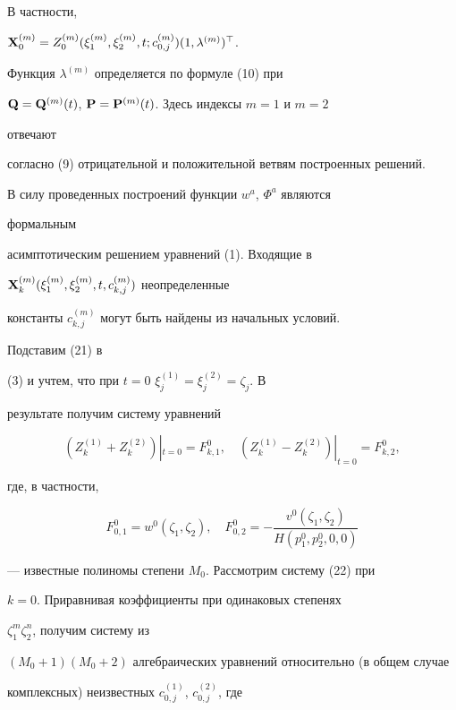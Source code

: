 В частности, 


$\BX^{(m)}_0=Z^{(m)}_0(\xi^{(m)}_1,\xi^{(m)}_2,t;c^{(m)}_{0,j}) 


(1,\lambda^{(m)})^\top$. 


Функция $\lambda^{(m)}$ определяется по формуле (10) при 


$\bold Q=\bold Q^{(m)}(t)$, $\bold P=\bold P^{(m)}(t)$. Здесь индексы $m=1$ и $m=2$ 


отвечают 


согласно (9) отрицательной и положительной ветвям построенных решений. 


 


В силу проведенных построений функции $w^a$, $\Phi^a$ являются 


формальным 


асимптотическим решением уравнений (1). Входящие в 


$\bold X^{(m)}_k(\xi^{(m)}_1,\xi^{(m)}_2,t,c^{(m)}_{k,j})$ неопределенные 


константы $c^{(m)}_{k,j}$ могут быть найдены из начальных условий. 


Подставим (21) в 


(3) и учтем, что при $t=0$\; $\xi^{(1)}_j=\xi^{(2)}_j=\zeta_j$. В 


результате получим систему уравнений 


\begin{equation} 


(Z^{(1)}_k+Z^{(2)}_k)|_{t=0}=F^0_{k,1},\quad 


(Z^{(1)}_k-Z^{(2)}_k)|_{t=0}=F^0_{k,2}, 


\end{equation} 


где, в частности, 


$$ 


F^0_{0,1}=w^0(\zeta_1,\zeta_2),\quad 


F^0_{0,2}=-\frac{v^0(\zeta_1,\zeta_2)}{H(p^0_1,p^0_2,0,0)} 


$$ 


--- известные полиномы степени $M_0$. Рассмотрим систему (22) при 


$k=0$. Приравнивая коэффициенты при одинаковых степенях 


$\zeta^m_1\zeta^n_2$, получим систему из 


$(M_0+1)(M_0+2)$ алгебраических уравнений относительно (в общем случае 


комплексных) неизвестных $c^{(1)}_{0,j}$, $c^{(2)}_{0,j}$, где 


